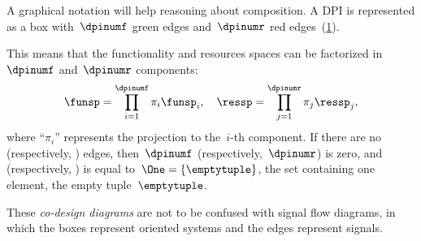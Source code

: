 A graphical notation will help reasoning about composition. A DPI is represented as a box with~$\dpinumf$ green edges and~$\dpinumr$ red edges~(\cref{fig:dp_graphical}).

\begin{figure}[h]
  \centering
  \caption{\label{fig:dp_graphical}}
\end{figure}


This means that the functionality and resources spaces can be factorized in~$\dpinumf$ and~$\dpinumr$ components:
\begin{equation*}
  \funsp=\prod_{i=1}^{\dpinumf}\pi_{i}\funsp_{i},\quad \ressp=\prod_{j=1}^{\dpinumr}\pi_{j}\ressp_{j},
\end{equation*}
where ``$\pi_{i}$'' represents the projection to the~$i$-th component.
If there are no  (respectively, ) edges, then~$\dpinumf$ (respectively,~$\dpinumr$) is zero, and \funsp (respectively, \ressp) is equal to~$\One=\{\emptytuple \}$, the set containing one element, the empty tuple~$\emptytuple$.

These \emph{co-design diagrams} are not to be confused with signal flow diagrams, in which the boxes represent oriented systems and the edges represent signals.


